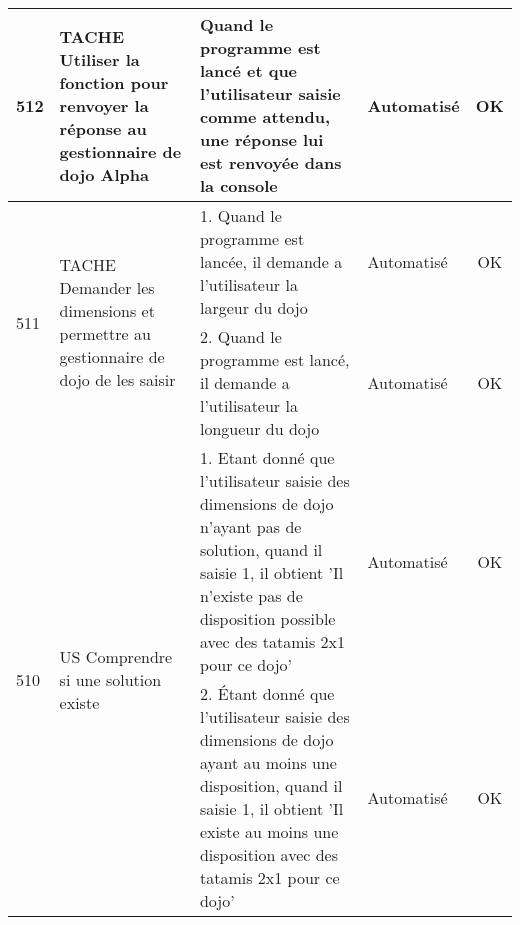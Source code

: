 \begin{adjustwidth}{-1.5cm}{0cm}
{\begin{tabular}{|m{0.6cm}|m{5.5cm}|m{8cm}|m{2cm}|c|}
            512                      & TACHE Utiliser la fonction pour renvoyer la réponse au gestionnaire de dojo	Alpha                                                              & Quand le programme est lancé et que l'utilisateur saisie comme attendu, une réponse lui est renvoyée dans la console                                                                                                       & Automatisé      & OK       \\ \hline
            \multirow{2}{0.6cm}{511} & \multirow{2}{5.5cm}{TACHE Demander les dimensions et permettre au gestionnaire de dojo de les saisir}                                         & 1. Quand le programme est lancée, il demande a l'utilisateur la largeur du dojo                                                                                                                                            & Automatisé      & OK       \\ \cline{3-5}
                                     &                                                                                                                                               & 2. Quand le programme est lancé, il demande a l'utilisateur la longueur du dojo                                                                                                                                            & Automatisé      & OK       \\ \hline
            \multirow{2}{0.6cm}{510} & \multirow{2}{5.5cm}{US Comprendre si une solution existe}                                                                                     & \cellcolor{tsyellow} 1. Etant donné que l'utilisateur saisie des dimensions de dojo n'ayant pas de solution, quand il saisie 1, il obtient 'Il n'existe pas de disposition possible avec des tatamis 2x1 pour ce dojo'     & Automatisé      & OK       \\ \cline{3-5}
                                     &                                                                                                                                               & \cellcolor{tsyellow} 2. Étant donné que l'utilisateur saisie des dimensions de dojo ayant au moins une disposition, quand il saisie 1, il obtient 'Il existe au moins une disposition avec des tatamis 2x1 pour ce dojo'   & Automatisé      & OK       \\ \hline
        \end{tabular}}
\end{adjustwidth}


